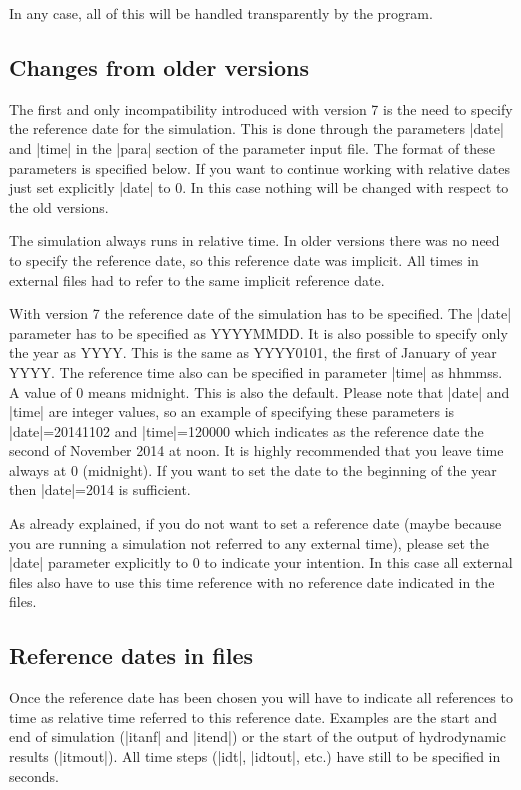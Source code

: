 \documentclass[12pt,draft]{article}
\begin{document}
In any case, all of this will be handled transparently by the 
program.

\subsection{Changes from older versions}

The first and only incompatibility introduced with version 7 is the 
need to specify the reference date for the simulation. This is
done through the parameters |date| and |time| in the |para|
section of the parameter input file. The format of these parameters is specified below. If you want to continue working with relative
dates just set explicitly |date| to 0. 
In this case nothing will be changed 
with respect to the old versions.

The simulation always runs in relative time. In older versions
there was no need to specify the reference date, so this reference date was implicit. All times in external files had to refer to the same
implicit reference date.

With version 7 the reference date of the simulation has to be specified. The |date| parameter has to be specified as
YYYYMMDD. It is also possible to specify only the year as YYYY. This
is the same as YYYY0101, the first of January of year YYYY. The 
reference time also can be specified in parameter |time|
as hhmmss. A value of 0 means midnight. This is also the
default. Please note that |date| and |time| are integer values,
so an example of specifying these parameters is 
|date|=20141102 and |time|=120000 which indicates as the
reference date the second of November 2014 at noon. It is highly recommended that you leave time always at 0 (midnight). If you
want to set the date to the beginning of the year then 
|date|=2014 is sufficient.

As already explained, if you do not want to set a reference date
(maybe because you are running a simulation not referred to
any external time), please set the |date| parameter explicitly to
0 to indicate your intention. In this case all external files
also have to use this time reference with no reference date
indicated in the files.

\subsection{Reference dates in files}

Once the reference date has been chosen you will have to indicate
all references to time as relative time referred to this reference date. Examples are the start and end of simulation (|itanf| and
|itend|) or the start of the output of hydrodynamic results 
(|itmout|). All time steps (|idt|, |idtout|, etc.) have still to be specified in seconds.
\end{document}
